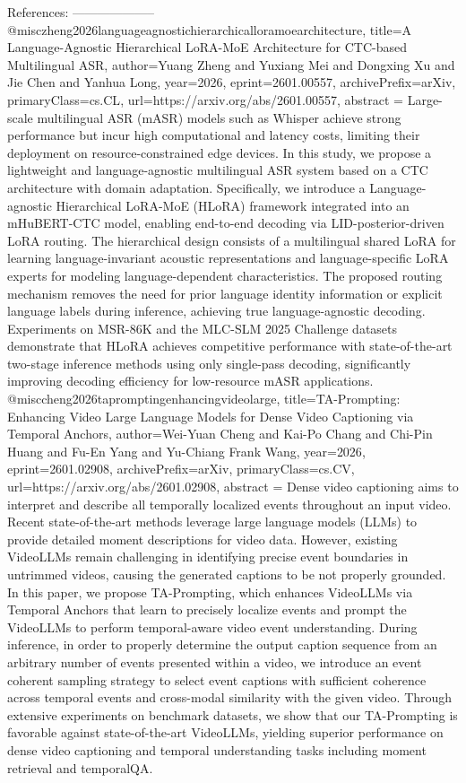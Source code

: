        References:
        --------------------
        @misc{zheng2026languageagnostichierarchicalloramoearchitecture,
      title={A Language-Agnostic Hierarchical LoRA-MoE Architecture for CTC-based Multilingual ASR}, 
      author={Yuang Zheng and Yuxiang Mei and Dongxing Xu and Jie Chen and Yanhua Long},
      year={2026},
      eprint={2601.00557},
      archivePrefix={arXiv},
      primaryClass={cs.CL},
      url={https://arxiv.org/abs/2601.00557},
      abstract = {Large-scale multilingual ASR (mASR) models such as Whisper achieve strong performance but incur high computational and latency costs, limiting their deployment on resource-constrained edge devices. In this study, we propose a lightweight and language-agnostic multilingual ASR system based on a CTC architecture with domain adaptation. Specifically, we introduce a Language-agnostic Hierarchical LoRA-MoE (HLoRA) framework integrated into an mHuBERT-CTC model, enabling end-to-end decoding via LID-posterior-driven LoRA routing. The hierarchical design consists of a multilingual shared LoRA for learning language-invariant acoustic representations and language-specific LoRA experts for modeling language-dependent characteristics. The proposed routing mechanism removes the need for prior language identity information or explicit language labels during inference, achieving true language-agnostic decoding. Experiments on MSR-86K and the MLC-SLM 2025 Challenge datasets demonstrate that HLoRA achieves competitive performance with state-of-the-art two-stage inference methods using only single-pass decoding, significantly improving decoding efficiency for low-resource mASR applications.}
}@misc{cheng2026tapromptingenhancingvideolarge,
      title={TA-Prompting: Enhancing Video Large Language Models for Dense Video Captioning via Temporal Anchors}, 
      author={Wei-Yuan Cheng and Kai-Po Chang and Chi-Pin Huang and Fu-En Yang and Yu-Chiang Frank Wang},
      year={2026},
      eprint={2601.02908},
      archivePrefix={arXiv},
      primaryClass={cs.CV},
      url={https://arxiv.org/abs/2601.02908},
      abstract = {Dense video captioning aims to interpret and describe all temporally localized events throughout an input video. Recent state-of-the-art methods leverage large language models (LLMs) to provide detailed moment descriptions for video data. However, existing VideoLLMs remain challenging in identifying precise event boundaries in untrimmed videos, causing the generated captions to be not properly grounded. In this paper, we propose TA-Prompting, which enhances VideoLLMs via Temporal Anchors that learn to precisely localize events and prompt the VideoLLMs to perform temporal-aware video event understanding. During inference, in order to properly determine the output caption sequence from an arbitrary number of events presented within a video, we introduce an event coherent sampling strategy to select event captions with sufficient coherence across temporal events and cross-modal similarity with the given video. Through extensive experiments on benchmark datasets, we show that our TA-Prompting is favorable against state-of-the-art VideoLLMs, yielding superior performance on dense video captioning and temporal understanding tasks including moment retrieval and temporalQA.}
}
